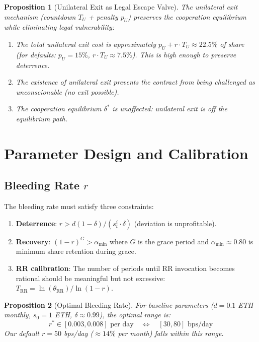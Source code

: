 \documentclass[12pt,a4paper]{article}
\newtheorem{proposition}{Proposition}
\begin{document}
\begin{proposition}[Unilateral Exit as Legal Escape Valve]
\label{prop:unilateral}
The unilateral exit mechanism (countdown $T_U$ + penalty $p_U$) preserves the cooperation equilibrium while eliminating legal vulnerability:
\begin{enumerate}[label=(\roman*)]
\item The total unilateral exit cost is approximately $p_U + r \cdot T_U \approx 22.5\%$ of share (for defaults: $p_U = 15\%$, $r \cdot T_U \approx 7.5\%$). This is high enough to preserve deterrence.
\item The existence of unilateral exit prevents the contract from being challenged as unconscionable (no exit possible).
\item The cooperation equilibrium $\delta^*$ is unaffected: unilateral exit is off the equilibrium path.
\end{enumerate}
\end{proposition}



\section{Parameter Design and Calibration}
\label{sec:parameters}

\subsection{Bleeding Rate $r$}

The bleeding rate must satisfy three constraints:

\begin{enumerate}
    \item \textbf{Deterrence}: $r > d(1-\delta) / (s_t^i \cdot \delta)$ (deviation is unprofitable).
    \item \textbf{Recovery}: $(1-r)^G > \alpha_{\min}$ where $G$ is the grace period and $\alpha_{\min} \approx 0.80$ is minimum share retention during grace.
    \item \textbf{RR calibration}: The number of periods until RR invocation becomes rational should be meaningful but not excessive: $T_{\text{RR}} = \ln(\theta_{\text{RR}}) / \ln(1-r)$.
\end{enumerate}

\begin{proposition}[Optimal Bleeding Rate]
For baseline parameters ($d = 0.1$ ETH monthly, $s_0 = 1$ ETH, $\delta \approx 0.99$), the optimal range is:
\[
r^* \in [0.003, 0.008] \text{ per day} \quad \Leftrightarrow \quad [30, 80] \text{ bps/day}
\]
Our default $r = 50$ bps/day ($\approx 14\%$ per month) falls within this range.
\end{proposition}
\end{document}
